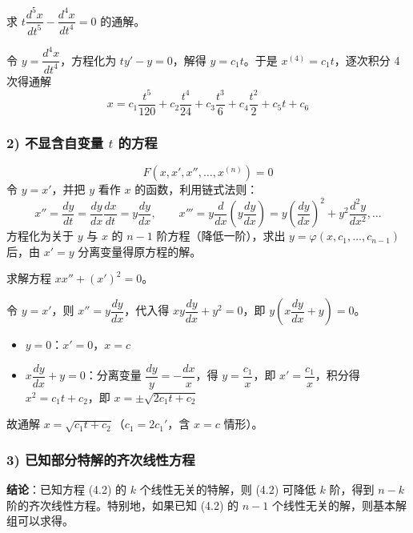 \begin{example}
求 $t\dfrac{d^5x}{dt^5} - \dfrac{d^4x}{dt^4} = 0$ 的通解。
\end{example}

\begin{solution}
令 $y = \dfrac{d^4x}{dt^4}$，方程化为 $ty' - y = 0$，解得 $y = c_1t$。于是 $x^{(4)} = c_1t$，逐次积分 4 次得通解
$$x = c_1\frac{t^5}{120} + c_2\frac{t^4}{24} + c_3\frac{t^3}{6} + c_4\frac{t^2}{2} + c_5t + c_6$$
\end{solution}

\subsubsection{2) 不显含自变量 $t$ 的方程}

\begin{equation}F(x, x', x'', \ldots, x^{(n)}) = 0 \tag{4.52}\end{equation}
令 $y = x'$，并把 $y$ 看作 $x$ 的函数，利用链式法则：
$$x'' = \frac{dy}{dt} = \frac{dy}{dx}\frac{dx}{dt} = y\frac{dy}{dx}, \qquad x''' = y\frac{d}{dx}\left(y\frac{dy}{dx}\right) = y\left(\frac{dy}{dx}\right)^2 + y^2\frac{d^2y}{dx^2}, \ldots$$
方程化为关于 $y$ 与 $x$ 的 $n-1$ 阶方程（降低一阶），求出 $y = \varphi(x, c_1, \ldots, c_{n-1})$ 后，由 $x' = y$ 分离变量得原方程的解。

\begin{example}
求解方程 $xx'' + (x')^2 = 0$。
\end{example}

\begin{solution}
令 $y = x'$，则 $x'' = y\dfrac{dy}{dx}$，代入得 $xy\dfrac{dy}{dx} + y^2 = 0$，即 $y(x\dfrac{dy}{dx} + y) = 0$。
\begin{itemize}
    \item $y = 0$：$x' = 0$，$x = c$
    \item $x\dfrac{dy}{dx} + y = 0$：分离变量 $\dfrac{dy}{y} = -\dfrac{dx}{x}$，得 $y = \dfrac{c_1}{x}$，即 $x' = \dfrac{c_1}{x}$，积分得 $x^2 = c_1 t + c_2$，即 $x = \pm\sqrt{2c_1t + c_2}$
\end{itemize}
故通解 $x = \sqrt{c_1 t + c_2}$（$c_1 = 2c_1'$，含 $x = c$ 情形）。
\end{solution}

\subsubsection{3) 已知部分特解的齐次线性方程}

\textbf{结论}：已知方程 (4.2) 的 $k$ 个线性无关的特解，则 (4.2) 可降低 $k$ 阶，得到 $n-k$ 阶的齐次线性方程。特别地，如果已知 (4.2) 的 $n-1$ 个线性无关的解，则基本解组可以求得。


